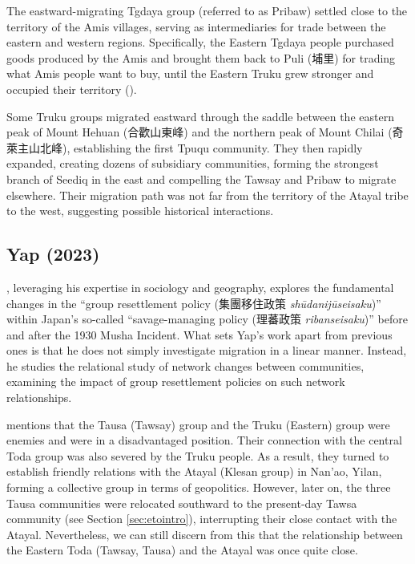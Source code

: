 The eastward-migrating Tgdaya group (referred to as Pribaw) settled close to the territory of the Amis villages, serving as intermediaries for trade between the eastern and western regions. Specifically, the Eastern Tgdaya people purchased goods produced by the Amis and brought them back to Puli (埔里) for trading what Amis people want to buy, until the Eastern Truku grew stronger and occupied their territory (\cite[70]{liao1977Sedtheruy}).

Some Truku groups migrated eastward through the saddle between the eastern peak of Mount Hehuan (合歡山東峰) and the northern peak of Mount Chilai (奇萊主山北峰), establishing the first Tpuqu community. They then rapidly expanded, creating dozens of subsidiary communities, forming the strongest branch of Seediq in the east and compelling the Tawsay and Pribaw to migrate elsewhere. Their migration path was not far from the territory of the Atayal tribe to the west, suggesting possible historical interactions.

\subsection{Yap (2023)}

\textcite{yap2023}, leveraging his expertise in sociology and geography, explores the fundamental changes in the ``group resettlement policy (集團移住政策 \textit{shūdanijūseisaku})'' within Japan's so-called ``savage-managing policy (理蕃政策 \textit{ribanseisaku})'' before and after the 1930 Musha Incident. What sets Yap's work apart from previous ones is that he does not simply investigate migration in a linear manner. Instead, he studies the relational study of network changes between communities, examining the impact of group resettlement policies on such network relationships.

\textcite[137,153]{yap2023} mentions that the Tausa (Tawsay) group and the Truku (Eastern) group were enemies and were in a disadvantaged position. Their connection with the central Toda group was also severed by the Truku people. As a result, they turned to establish friendly relations with the Atayal (Klesan group) in Nan'ao, Yilan, forming a collective group in terms of geopolitics. However, later on, the three Tausa communities were relocated southward to the present-day Tawsa community (see Section \ref{sec:etointro}), interrupting their close contact with the Atayal. Nevertheless, we can still discern from this that the relationship between the Eastern Toda (Tawsay, Tausa) and the Atayal was once quite close.

